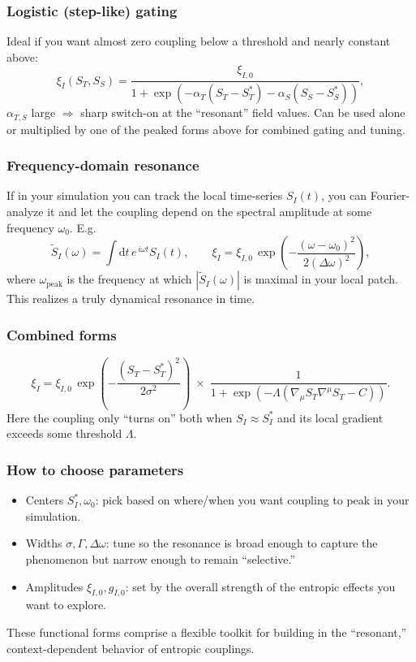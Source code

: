\documentclass[11pt,a4paper]{article} %
\newcommand{\ST}{S_T}
\newcommand{\SSp}{S_S} %
\newcommand{\Adtm}{\text{d}t} %
\begin{document}
\subsubsection{Logistic (step-like) gating}
Ideal if you want almost zero coupling below a threshold and nearly constant above:
\begin{equation*}
\xi_{I}(\ST,\SSp) =\frac{\xi_{I,0}} {1+\exp{\left(-\alpha_T(\ST-\ST^*) -\alpha_S(\SSp-\SSp^*)\right)}},
\end{equation*}
$\alpha_{T,S}$ large $\Rightarrow$ sharp switch-on at the ``resonant'' field values.
Can be used alone or multiplied by one of the peaked forms above for combined gating and tuning.

\subsubsection{Frequency-domain resonance}
If in your simulation you can track the local time-series $S_I(t)$, you can Fourier-analyze it and let the coupling depend on the spectral amplitude at some frequency $\omega_0$. E.g.
\begin{equation*}
\widetilde S_I(\omega) =\int \Adtm\,e^{\,i\omega t}S_I(t),\qquad \xi_I =\xi_{I,0}\, \exp\!{\left(-\frac{(\omega-\omega_0)^2}{2(\Delta\omega)^2}\right)},
\end{equation*}
where $\omega_{\text{peak}}$ is the frequency at which $|\widetilde S_I(\omega)|$ is maximal in your local patch. This realizes a truly dynamical resonance in time.

\subsubsection{Combined forms}
\begin{equation*}
\xi_I =\xi_{I,0}\, \exp\!{\left(-\frac{(\ST-\ST^*)^2}{2\sigma^2}\right)}\; \times\; \frac{1}{1+\exp{\left(-\Lambda(\nabla_\mu\ST\nabla^\mu\ST-C)\right)}}.
\end{equation*}
Here the coupling only ``turns on'' both when $S_I\approx S_I^*$ and its local gradient exceeds some threshold $\Lambda$.

\subsubsection{How to choose parameters}
\begin{itemize}
    \item Centers $S_I^*, \omega_0$: pick based on where/when you want coupling to peak in your simulation.
    \item Widths $\sigma,\Gamma,\Delta\omega$: tune so the resonance is broad enough to capture the phenomenon but narrow enough to remain ``selective.''
    \item Amplitudes $\xi_{I,0},g_{I,0}$: set by the overall strength of the entropic effects you want to explore.
\end{itemize}
These functional forms comprise a flexible toolkit for building in the ``resonant,'' context-dependent behavior of entropic couplings.
\end{document}
